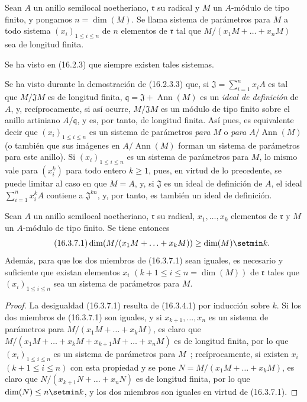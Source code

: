 \begin{definition}[16.3.6]
\label{0.16.3.6-fr}
Sean $A$ un anillo semilocal noetheriano, $\mathfrak{r}$ su radical y $M$ un
$A$-módulo de tipo finito, y pongamos $n=\dim(M)$. Se llama sistema de
parámetros para $M$ a todo sistema $(x_i)_{1\leq i\leq n}$ de $n$ elementos de
$\mathfrak{r}$ tal que $M/(x_1M+\ldots+x_nM)$ sea de longitud finita.
\end{definition}

Se ha visto en (16.2.3) que siempre existen tales sistemas.

Se ha visto durante la demostración de (16.2.3.3) que, si
$\mathfrak{J}=\sum_{i=1}^n x_iA$ es tal que $M/\mathfrak{J}M$ es de
longitud finita, $\mathfrak{q}=\mathfrak{J}+\operatorname{Ann}(M)$ es un
\emph{ideal de definición} de $A$, y, recíprocamente, si así ocurre,
$M/\mathfrak{J}M$ es un módulo de tipo finito sobre el anillo artiniano
$A/\mathfrak{q}$, y es, por tanto, de longitud finita. Así pues, es equivalente decir
que $(x_i)_{1\leq i\leq n}$ es un sistema de parámetros \emph{para $M$} o
\emph{para $A/\operatorname{Ann}(M)$} (o también que sus imágenes en
$A/\operatorname{Ann}(M)$ forman un sistema de parámetros para este anillo).
Si $(x_i)_{1\leq i\leq n}$ es un sistema de parámetros para $M$, lo mismo vale
para $(x_i^k)$ para todo entero $k\geq1$, pues, en virtud de lo precedente,
se puede limitar al caso en que $M=A$, y, si $\mathfrak{J}$ es un ideal de
definición de $A$, el ideal $\sum_{i=1}^n x_i^kA$ contiene a
$\mathfrak{J}^{kn}$, y, por tanto, es también un ideal de definición.

\begin{proposition}[16.3.7]
\label{0.16.3.7-fr}
Sean $A$ un anillo semilocal noetheriano, $\mathfrak{r}$ su radical,
$x_1,\ldots,x_k$ elementos de $\mathfrak{r}$ y $M$ un $A$-módulo de tipo
finito. Se tiene entonces
\begin{equation}
\label{0.16.3.7.1-fr}
\tag{16.3.7.1}
  \dim(M/(x_1M+\ldots+x_kM))\geq\dim(M)\setmin k.
\end{equation}
Además, para que los dos miembros de \textup{(16.3.7.1)} sean iguales, es necesario y
suficiente que existan elementos $x_i$
$(k+1\leq i\leq n=\dim(M))$ de $\mathfrak{r}$ tales que
$(x_i)_{1\leq i\leq n}$ sea un sistema de parámetros para $M$.
\end{proposition}

\begin{proof}
La desigualdad (16.3.7.1) resulta de (16.3.4.1) por inducción sobre $k$. Si los
dos miembros de (16.3.7.1) son iguales, y si $x_{k+1},\ldots,x_n$ es un
sistema de parámetros para $M/(x_1M+\ldots+x_kM)$, es claro que
$M/(x_1M+\ldots+x_kM+x_{k+1}M+\ldots+x_nM)$ es de longitud finita, por lo que
$(x_i)_{1\leq i\leq n}$ es un sistema de parámetros para $M$~;
recíprocamente, si existen $x_i$ $(k+1\leq i\leq n)$ con esta propiedad y se
pone $N=M/(x_1M+\ldots+x_kM)$, es claro que
$N/(x_{k+1}N+\ldots+x_nN)$ es de longitud finita, por lo que
$\dim(N)\leq n\setmin k$, y los dos miembros son iguales en virtud de (16.3.7.1).
\end{proof}


